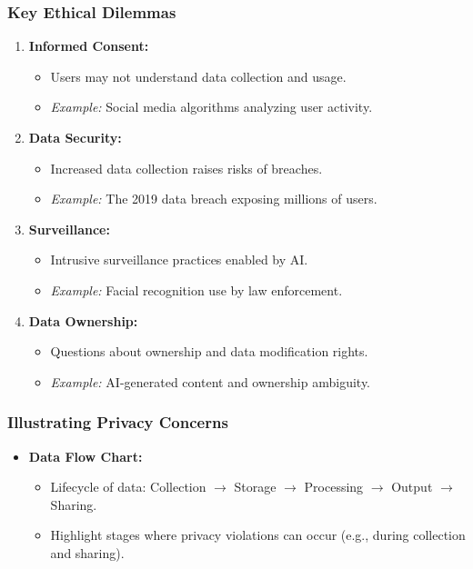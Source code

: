 \documentclass[aspectratio=169]{beamer}
\begin{document}
\begin{frame}[fragile]
  \frametitle{Key Ethical Dilemmas}
  \begin{enumerate}
    \item \textbf{Informed Consent:}
    \begin{itemize}
      \item Users may not understand data collection and usage.
      \item \textit{Example:} Social media algorithms analyzing user activity.
    \end{itemize}
    
    \item \textbf{Data Security:}
    \begin{itemize}
      \item Increased data collection raises risks of breaches.
      \item \textit{Example:} The 2019 data breach exposing millions of users.
    \end{itemize}
    
    \item \textbf{Surveillance:}
    \begin{itemize}
      \item Intrusive surveillance practices enabled by AI.
      \item \textit{Example:} Facial recognition use by law enforcement.
    \end{itemize}

    \item \textbf{Data Ownership:}
    \begin{itemize}
      \item Questions about ownership and data modification rights.
      \item \textit{Example:} AI-generated content and ownership ambiguity.
    \end{itemize}
  \end{enumerate}
\end{frame}

\begin{frame}[fragile]
  \frametitle{Illustrating Privacy Concerns}
  \begin{itemize}
    \item \textbf{Data Flow Chart:}
    \begin{itemize}
      \item Lifecycle of data: Collection $\rightarrow$ Storage $\rightarrow$ Processing $\rightarrow$ Output $\rightarrow$ Sharing.
      \item Highlight stages where privacy violations can occur (e.g., during collection and sharing).
    \end{itemize}
  \end{itemize}
\end{frame}
\end{document}
